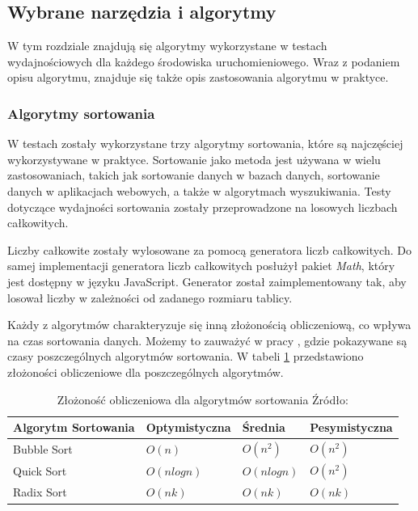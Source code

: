 \subsection{Wybrane narzędzia i algorytmy}
W tym rozdziale znajdują się algorytmy wykorzystane w testach wydajnościowych dla każdego środowiska uruchomieniowego. Wraz z podaniem opisu algorytmu, znajduje się także opis zastosowania algorytmu w praktyce.

\subsubsection{Algorytmy sortowania}
W testach zostały wykorzystane trzy algorytmy sortowania, które są najczęściej wykorzystywane w praktyce. Sortowanie jako metoda jest używana w wielu zastosowaniach, takich jak sortowanie danych w bazach danych, sortowanie danych w aplikacjach webowych, a także w algorytmach wyszukiwania. Testy dotyczące wydajności sortowania zostały przeprowadzone na losowych liczbach całkowitych.

Liczby całkowite zostały wylosowane za pomocą generatora liczb całkowitych. Do samej implementacji generatora liczb całkowitych posłużył pakiet \textit{Math}, który jest dostępny w języku JavaScript. Generator został zaimplementowany tak, aby losował liczby w zależności od zadanego rozmiaru tablicy.

Każdy z algorytmów charakteryzuje się inną złożonością obliczeniową, co wpływa na czas sortowania danych. Możemy to zauważyć w pracy \cite{sorting}, gdzie pokazywane są czasy poszczególnych algorytmów sortowania. W tabeli \ref{tab:sorting_complexity} przedstawiono złożoności obliczeniowe dla poszczególnych algorytmów.

\begin{table}[H]
  \centering
  \caption{Złożoność obliczeniowa dla algorytmów sortowania Źródło: \cite{sorting}}
  \begin{tabular}{|l|l|l|l|}
  \hline
  \textbf{Algorytm Sortowania} & \textbf{Optymistyczna} & \textbf{Średnia} & \textbf{Pesymistyczna} \\ \hline
    Bubble Sort & $O(n)$ & $O(n^2)$ & $O(n^2)$ \\ 
    \hline
    Quick Sort & $O(n log n)$ & $O(n log n)$ & $O(n^2)$ \\ 
    \hline
    Radix Sort & $O(nk)$ & $O(nk)$ & $O(nk)$ \\
    \hline
  \end{tabular}
  \label{tab:sorting_complexity}
\end{table}

